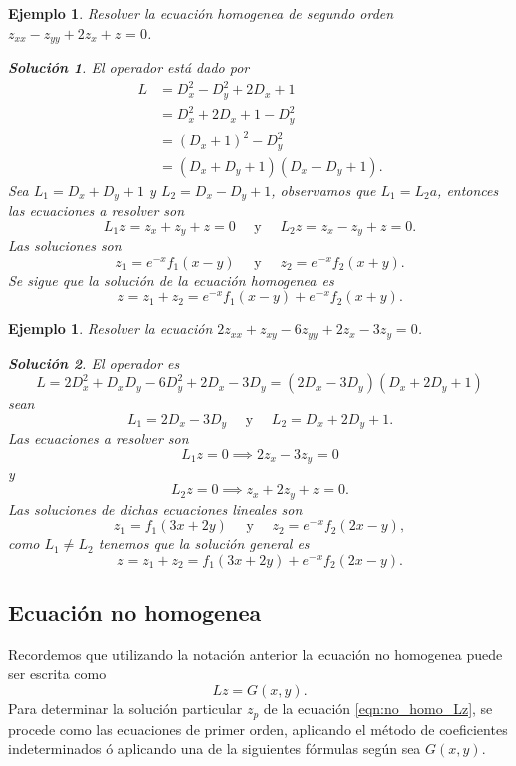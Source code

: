 \documentclass[11pt,letterpaper,draft]{report}
\newtheorem{example}[defn]{Ejemplo}
\newtheorem*{sol}{Solución}
\newcommand\<{\langle}
\renewcommand\>{\rangle}
\begin{document}
\begin{example}
  Resolver la ecuación homogenea de segundo orden $z_{xx} -
z_{yy} + 2z_x + z = 0$.
\begin{sol}
  El operador está dado por
  \begin{align*}
    L &= D_x^2 - D_y^2 + 2D_x + 1\\
      &= D_x^2 + 2D_x + 1 - D_y^2\\
      &= (D_x+1)^2 - D_y^2\\
      &= (D_x + D_y + 1)(D_x - D_y + 1).
  \end{align*}
  Sea $L_1 = D_x + D_y + 1$ y $L_2 = D_x - D_y + 1$,
  observamos que $L_1 = L_2a$, entonces las ecuaciones a
  resolver son
  \[
  L_1 z = z_x + z_y + z = 0 \quad \text{ y } \quad L_2 z =
  z_x - z_y + z = 0.
  \] 
  Las soluciones son
  \[
  z_1 = e^{-x}f_1(x-y) \quad \text{ y } \quad z_2 =
  e^{-x}f_2(x+y).
  \] 
  Se sigue que la solución de la ecuación homogenea es
  \[
  z = z_1 + z_2 = e^{-x}f_1(x-y) + e^{-x}f_2(x+y).
  \] 
\end{sol}
\end{example}

\begin{example}
  Resolver la ecuación $2z_{xx} + z_{xy} - 6z_{yy} + 2z_x -
  3z_y = 0$.
  \begin{sol}
    El operador es
    \[
    L = 2D_x^2 + D_xD_y - 6D_y^2 + 2D_x - 3D_y =
    (2D_x-3D_y)(D_x+2D_y+1)
    \] 
    sean
    \[
    L_1 = 2D_x - 3D_y \quad \text{ y } \quad L_2 = D_x + 2D_y
    + 1.
    \] 
    Las ecuaciones a resolver son
    \[
    L_1z = 0 \implies 2z_x - 3z_y = 0
    \] 
    y
    \[
    L_2z = 0 \implies z_x + 2z_y + z = 0.
    \] 
    Las soluciones de dichas ecuaciones lineales son
    \[
    z_1 = f_1(3x+2y) \quad \text{ y } \quad z_2 =
    e^{-x}f_2(2x-y),
    \] 
    como $L_1 \neq L_2$ tenemos que la solución general es
    \[
    z = z_1 + z_2 = f_1(3x+2y) + e^{-x}f_2(2x-y).
    \] 
  \end{sol}
\end{example}

\subsection{Ecuación no homogenea}

Recordemos que utilizando la notación anterior la ecuación
no homogenea puede ser escrita como
\begin{equation}
  \label{eqn:no_homo_Lz}
  Lz = G(x,y).
\end{equation}
Para determinar la solución particular $z_p$ de la ecuación
\ref{eqn:no_homo_Lz}, se procede como las ecuaciones de
primer orden, aplicando el método de coeficientes
indeterminados ó aplicando una de la siguientes fórmulas
según sea $G(x,y)$.
\end{document}
